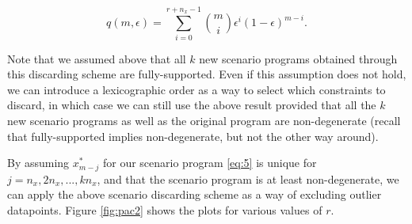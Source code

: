 \documentclass[11pt]{article}
\begin{document}
\begin{equation}
	\label{eq:6}
	q(m,\epsilon) = \sum_{i=0}^{r+n_{x}-1}{m \choose i}\epsilon^{i}(1-\epsilon)^{m-i}.
\end{equation}

Note that we assumed above that all $k$ new scenario programs obtained through this discarding scheme are fully-supported. Even if this assumption does not hold, we can introduce a lexicographic order as a way to select which constraints to discard, in which case we can still use the above result provided that all the $k$ new scenario programs as well as the original program are non-degenerate (recall that fully-supported implies non-degenerate, but not the other way around).

By assuming $x^{*}_{m-j}$ for our scenario program \ref{eq:5} is unique for $j=n_{x},2n_{x},...,kn_{x}$, and that the scenario program is at least non-degenerate, we can apply the above scenario discarding scheme as a way of excluding outlier datapoints. Figure \ref{fig:pac2} shows the plots for various values of $r$.



\begin{figure}[!htb]
	\centering
	\hfill
	\hfill
\end{figure}
\end{document}

